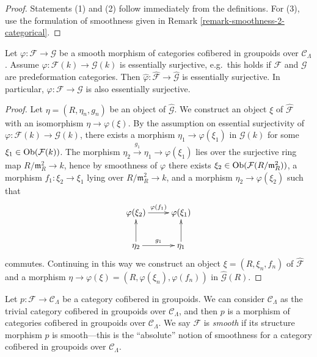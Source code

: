 \begin{proof}
Statements (1) and (2) follow immediately from the definitions.  For (3), use 
the formulation of smoothness given in Remark 
\ref{remark-smoothness-2-categorical}.
\end{proof}

\begin{lemma}
\label{lemma-smooth-morphism-essentially-surjective}
Let $\varphi: \mathcal F \rightarrow \mathcal G$ be a smooth morphism of 
categories cofibered in groupoids over $\mathcal C_{\Lambda}$.  Assume 
$\varphi: \mathcal F(k) \rightarrow \mathcal G(k)$ is essentially surjective, 
e.g.\ this holds if $\mathcal F$ and $\mathcal G$ are predeformation 
categories. Then $\widehat{\varphi}: \widehat{\mathcal F} \rightarrow 
\widehat{\mathcal G}$ is essentially surjective.  In particular, $\varphi: 
\mathcal F \rightarrow \mathcal G$ is also essentially surjective.
\end{lemma}

\begin{proof}
Let $\eta = (R,\eta_{n},g_n)$ be an object of $\widehat{\mathcal G}$.  We 
construct an object $\xi$ of $\widehat{\mathcal F}$ with an isomorphism $\eta 
\rightarrow \varphi(\xi)$. By the assumption on essential surjectivity of 
$\varphi: \mathcal F(k) \rightarrow \mathcal G(k)$, there exists a morphism 
$\eta_{1} \rightarrow \varphi(\xi_1)$ in $\mathcal G(k)$ for some $\xi_{1} \in 
\textnormal{Ob}(\mathcal F(k))$.  The morphism $\eta_{2} \xrightarrow{g_1} 
\eta_{1} \rightarrow  \varphi(\xi_1)$ lies over the surjective ring map 
$R/\mathfrak{m}_R^2 \rightarrow k$, hence by smoothness of $\varphi$ there 
exists $\xi_{2} \in \textnormal{Ob}(\mathcal F(R/\mathfrak{m}_R^2))$, a 
morphism $f_1: \xi_{2} \rightarrow \xi_{1}$ lying over $R/\mathfrak{m}_R^2 
\rightarrow k$, and a morphism $\eta_{2} \rightarrow \varphi(\xi_2)$ such that 
\[
\xymatrix{
\varphi(\xi_{2})  \ar[r]^{\varphi(f_1)} &  \varphi(\xi_{1})   \\
\eta_{2}   \ar[u] \ar[r]^{g_1}  & \eta_1  \ar[u] \\
}
\]
commutes.  Continuing in this way we construct an object $\xi = 
(R,\xi_{n},f_{n})$ of $\widehat{\mathcal F}$ and a morphism $\eta \rightarrow 
\varphi(\xi) = (R,\varphi(\xi_n),\varphi(f_{n}))$ in $\widehat{\mathcal G}(R)$.
\end{proof}

\begin{remark}
\label{remark-cofibered-groupoid-projection-smooth}
Let $p: \mathcal F \rightarrow \mathcal C_{\Lambda}$ be a category cofibered in 
groupoids. We can consider $\mathcal C_{\Lambda}$ as the trivial category 
cofibered in groupoids over $\mathcal C_{\Lambda}$, and then $p$ is a morphism 
of categories cofibered in groupoids over $\mathcal C_{\Lambda}$.  We say 
$\mathcal F$ is {\it smooth} if its structure morphism $p$ is smooth---this is 
the ``absolute'' notion of smoothness for a category cofibered in groupoids 
over $\mathcal C_{\Lambda}$.
\end{remark}

